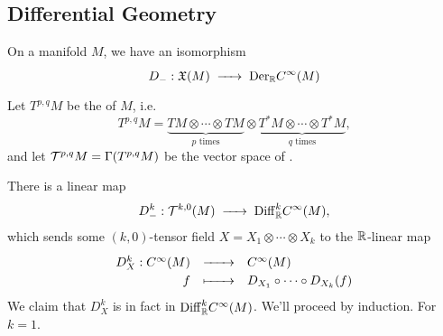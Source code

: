 \documentclass{lkx_paper}
\providecommand{\Diff}{\mathrm{Diff}}
\begin{document}
\subsection*{Differential Geometry}

\begin{proposition*}
	On a manifold $M$, we have an isomorphism
	\[
		D_- : \X(M) \longto \Der_\R C^\infty(M)
	\]
\end{proposition*}

\begin{definition*}
	Let $T^{p,q}M$ be the  of $M$, i.e.
	\[
		T^{p,q}M = \underbrace{TM\otimes\cdots\otimes TM}_{p\textrm{ times}}\otimes \underbrace{T^*M\otimes \cdots \otimes T^* M}_{q\textrm{ times}},
	\]
	and let $\mathcal{T}^{p,q}M = \Gamma(T^{p,q} M)$ be the vector space of .


\end{definition*}

There is a linear map
\[
	D^k_- : \T^{k, 0}(M) \longto \Diff_\R^k C^\infty(M),
\]
which sends some $(k,0)$-tensor field $X=X_1\otimes \cdots \otimes X_k$ to the $\mathbb{R}$-linear map
\[
	\definefunction{D^k_X}{C^\infty(M)}{C^\infty(M)}{f}{D_{X_1}\circ \cdots\circ D_{X_k}(f)}
\]
We claim that $D_X^k$ is in fact in $\Diff^k_{\R} C^\infty(M)$. We'll proceed by induction. For $k=1$.

%
\end{document}
